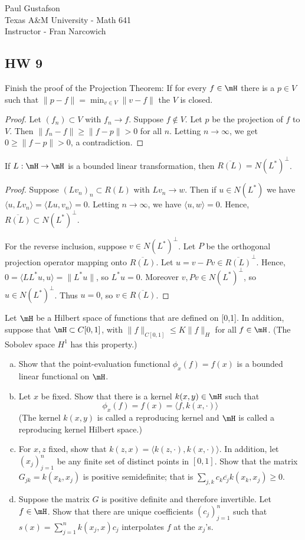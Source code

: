 \documentclass{article}
\begin{document}
\noindent Paul Gustafson\\
\noindent Texas A\&M University - Math 641\\ 
\noindent Instructor - Fran Narcowich

\subsection*{HW 9}
 Finish the proof of the Projection Theorem: If for every $f \in \mH$ there is a $p \in V$ such that $\|p - f\| = \min_{v \in V} \|v - f\|$ the $V$ is closed.

\begin{proof}
Let $(f_n) \subset V$ with $f_n \to f$. Suppose $f \not\in V$.  Let $p$ be the projection of $f$ to $V$.  Then $\|f_n - f\| \ge \|f - p\| > 0$ for all $n$. Letting $n \to \infty$, we get $0 \ge \|f - p \| > 0$,  a contradiction.
\end{proof}

 If $L : \mH \to \mH$ is a bounded linear transformation, then $\overline{R(L)} = N (L^*)^\perp$.
\begin{proof}
Suppose $(Lv_n)_n \subset  R(L)$ with $Lv_n \to w$.  Then if $u \in N(L^*)$ we have $\langle u, L v_n \rangle = \langle L u , v_n \rangle = 0$. Letting $n \to \infty$, we have $\langle u, w \rangle = 0$.  Hence, $\overline{R(L)} \subset N(L^*)^\perp$.

For the reverse inclusion, suppose $v \in N(L^*)^\perp$.  Let $P$ be the orthogonal projection operator mapping onto $\overline{R(L)}$.  Let $u = v - Pv \in \overline{R(L)}^\perp$. Hence, $0 = \langle L L^* u, u \rangle = \|L^*u\|$, so $L^*u = 0$.  Moreover $v, Pv \in N(L^*)^\perp$, so $u \in N(L^*)^\perp$.   Thus $u = 0$, so $v \in \overline{R(L)}$.
\end{proof}

 Let $\mH$ be a Hilbert space of functions that are defined on [0,1]. In addition, suppose that $\mH \subset C[0,1]$, with $\|f\|_{C[0,1]} \le K \|f \|_H$ for all $f \in \mH$. (The Sobolev space $H^1$ has this property.)

\begin{enumerate}[a.]
\item Show that the point-evaluation functional $\phi_x(f) = f(x)$ is a bounded linear functional on $\mH$.
\item Let $x$ be fixed. Show that there is a kernel $k(x,y) \in \mH$ such that 
$$ \phi_x(f) = f(x) = \langle f , k(x, \cdot) \rangle$$
(The kernel $k(x,y)$ is called a reproducing kernel and $\mH$ is called a reproducing kernel Hilbert space.)
\item For $x, z$ fixed, show that $k(z,x) = \langle k(z, \cdot), k(x, \cdot) \rangle$. In addition, let $(x_j)_{j=1}^n$ be any finite set of distinct points in $[0,1]$.  Show that the matrix $G_{jk} = k(x_k, x_j)$ is positive semidefinite; that is $\sum_{j,k} c_k \overline{c_j} k(x_k, x_j) \ge 0$.
\item Suppose the matrix $G$ is positive definite and therefore invertible. Let $f \in \mH$. Show that there are unique coefficients $(c_j)_{j=1}^n$ such that $s(x) = \sum_{j=1}^n k(x_j, x) c_j$ interpolates $f$ at the $x_j$'s.
\end{enumerate}
\end{document}
